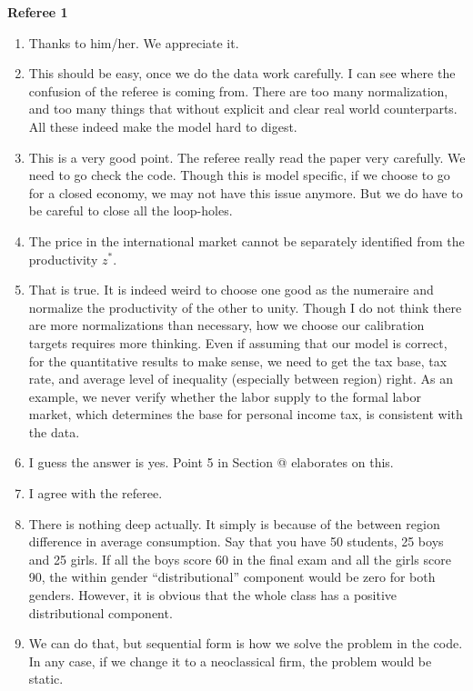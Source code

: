 \documentclass[twoside,11pt,leqno]{article}
\makeatletter
\newcommand*{\rom}[1]{\expandafter\@slowromancap\romannumeral #1@}
\makeatother
\begin{document}
\begin{flushleft}
\textbf{Referee 1}
\end{flushleft}
\begin{enumerate}
    \item
    Thanks to him/her. We appreciate it.
    \item
    This should be easy, once we do the data work carefully. I can see where the confusion of the referee is coming from. There are too many normalization, and too many things that without explicit and clear real world counterparts. All these indeed make the model hard to digest.
    \item
    This is a very good point. The referee really read the paper very carefully. We need to go check the code. Though this is model specific, if we choose to go for a closed economy, we may not have this issue anymore. But we do have to be careful to close all the loop-holes.
    \item
    The price in the international market cannot be separately identified from the productivity $z^*$.
    \item
    That is true. It is indeed weird to choose one good as the numeraire and normalize the productivity of the other to unity. Though I do not think there are more normalizations than necessary, how we choose our calibration targets requires more thinking. Even if assuming that our model is correct, for the quantitative results to make sense, we need to get the tax base, tax rate, and average level of inequality (especially between region) right. As an example, we never verify whether the labor supply to the formal labor market, which determines the base for personal income tax, is consistent with the data.
    \item
    I guess the answer is yes. Point 5 in Section \rom{2} elaborates on this.
    \item
    I agree with the referee.
    \item
    There is nothing deep actually. It simply is because of the between region difference in average consumption. Say that you have 50 students, 25 boys and 25 girls. If all the boys score 60 in the final exam and all the girls score 90, the within gender ``distributional'' component would be zero for both genders. However, it is obvious that the whole class has a positive distributional component.
    \item
    We can do that, but sequential form is how we solve the problem in the code. In any case, if we change it to a neoclassical firm, the problem would be static.

\end{enumerate}
\end{document}
